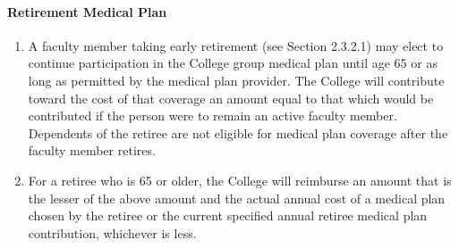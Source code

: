 \documentclass[letterpaper, 11pt]{article}
\begin{document}
			\paragraph{Retirement Medical Plan}
				\begin{enumerate}[label=\alph*)]
					\item{A faculty member taking early retirement (see Section 2.3.2.1) may elect to continue participation in the College group medical plan until age 65 or as long as permitted by the medical plan provider.  The College will contribute toward the cost of that coverage an amount equal to that which would be contributed if the person were to remain an active faculty member.  Dependents of the retiree are not eligible for medical plan coverage after the faculty member retires.}
					\item{For a retiree who is 65 or older, the College will reimburse an amount that is the lesser of the above amount and the actual annual cost of a medical plan chosen by the retiree or the current specified annual retiree medical plan contribution, whichever is less.}
				\end{enumerate}
\end{document}
